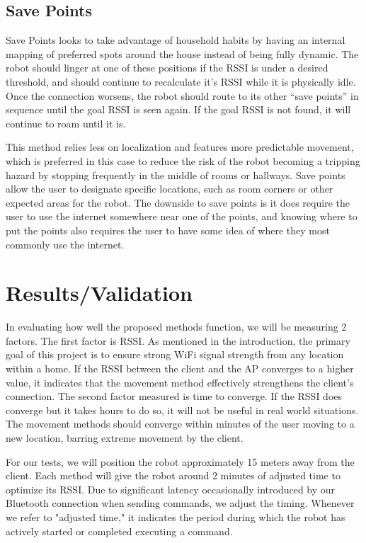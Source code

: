 \subsection{Save Points}
Save Points looks to take advantage of household habits by having an internal mapping of preferred spots around the house instead of being fully dynamic. The robot should linger at one of these positions if the RSSI is under a desired threshold, and should continue to recalculate it’s RSSI while it is physically idle. Once the connection worsens, the robot should route to its other “save points” in sequence until the goal RSSI is seen again. If the goal RSSI is not found, it will continue to roam until it is. 

This method relies less on localization and features more predictable movement, which is preferred in this case to reduce the risk of the robot becoming a tripping hazard by stopping frequently in the middle of rooms or hallways. Save points allow the user to designate specific locations, such as room corners or other expected areas for the robot. The downside to save points is it does require the user to use the internet somewhere near one of the points, and knowing where to put the points  also requires the user to have some idea of where they most commonly use the internet.

\section{Results/Validation}
In evaluating how well the proposed methods function, we will be measuring 2 factors. The first factor is RSSI. As mentioned in the introduction, the primary goal of this project is to ensure strong WiFi signal strength from any location within a home. If the RSSI between the client and the AP converges to a higher value, it indicates that the movement method effectively strengthens the client’s connection. The second factor measured is time to converge. If the RSSI does converge but it takes hours to do so, it will not be useful in real world situations. The movement methods should converge within minutes of the user moving to a new location, barring extreme movement by the client. 

For our tests, we will position the robot approximately 15 meters away from the client. Each method will give the robot around 2 minutes of adjusted time to optimize its RSSI. Due to significant latency occasionally introduced by our Bluetooth connection when sending commands, we adjust the timing. Whenever we refer to "adjusted time," it indicates the period during which the robot has actively started or completed executing a command.
